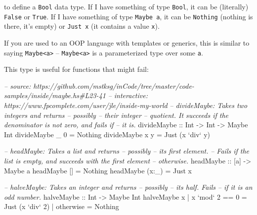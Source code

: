 \documentclass[]{article}
\newenvironment{Shaded}{}{}
\newcommand{\DataTypeTok}[1]{\textcolor[rgb]{0.56,0.13,0.00}{{#1}}}
\newcommand{\DecValTok}[1]{\textcolor[rgb]{0.25,0.63,0.44}{{#1}}}
\newcommand{\CommentTok}[1]{\textcolor[rgb]{0.38,0.63,0.69}{\textit{{#1}}}}
\newcommand{\OtherTok}[1]{\textcolor[rgb]{0.00,0.44,0.13}{{#1}}}
\newcommand{\FunctionTok}[1]{\textcolor[rgb]{0.02,0.16,0.49}{{#1}}}
\newcommand{\NormalTok}[1]{{#1}}
\begin{document}
to define a \texttt{Bool} data type. If I have something of type
\texttt{Bool}, it can be (literally) \texttt{False} or \texttt{True}. If
I have something of type \texttt{Maybe\ a}, it can be \texttt{Nothing}
(nothing is there, it's empty) or \texttt{Just\ x} (it contains a value
\texttt{x}).

If you are used to an OOP language with templates or generics, this is
similar to saying \texttt{Maybe\textless{}a\textgreater{}} --
\texttt{Maybe\textless{}a\textgreater{}} is a parameterized type over
some \texttt{a}.

This type is useful for functions that might fail:

\begin{Shaded}
\begin{Highlighting}[]
\CommentTok{-- source: https://github.com/mstksg/inCode/tree/master/code-samples/inside/maybe.hs#L23-41}
\CommentTok{-- interactive: https://www.fpcomplete.com/user/jle/inside-my-world}
\CommentTok{-- divideMaybe: Takes two integers and returns -- possibly -- their integer}
\CommentTok{--      quotient. It succeeds if the denominator is not zero, and fails if}
\CommentTok{--      it is.}
\OtherTok{divideMaybe ::} \DataTypeTok{Int} \OtherTok{->} \DataTypeTok{Int} \OtherTok{->} \DataTypeTok{Maybe} \DataTypeTok{Int}
\NormalTok{divideMaybe _ }\DecValTok{0} \FunctionTok{=} \DataTypeTok{Nothing}
\NormalTok{divideMaybe x y }\FunctionTok{=} \DataTypeTok{Just} \NormalTok{(x }\OtherTok{`div`} \NormalTok{y)}

\CommentTok{-- headMaybe: Takes a list and returns -- possibly -- its first element.}
\CommentTok{--      Fails if the list is empty, and succeeds with the first element}
\CommentTok{--      otherwise.}
\OtherTok{headMaybe ::} \NormalTok{[a] }\OtherTok{->} \DataTypeTok{Maybe} \NormalTok{a}
\NormalTok{headMaybe []    }\FunctionTok{=} \DataTypeTok{Nothing}
\NormalTok{headMaybe (x}\FunctionTok{:}\NormalTok{_) }\FunctionTok{=} \DataTypeTok{Just} \NormalTok{x}

\CommentTok{-- halveMaybe: Takes an integer and returns -- possibly -- its half.  Fails}
\CommentTok{--      if it is an odd number.}
\OtherTok{halveMaybe ::} \DataTypeTok{Int} \OtherTok{->} \DataTypeTok{Maybe} \DataTypeTok{Int}
\NormalTok{halveMaybe x }\FunctionTok{|} \NormalTok{x }\OtherTok{`mod`} \DecValTok{2} \FunctionTok{==} \DecValTok{0} \FunctionTok{=} \DataTypeTok{Just} \NormalTok{(x }\OtherTok{`div`} \DecValTok{2}\NormalTok{)}
             \FunctionTok{|} \NormalTok{otherwise      }\FunctionTok{=} \DataTypeTok{Nothing}
\end{Highlighting}
\end{Shaded}
\end{document}
